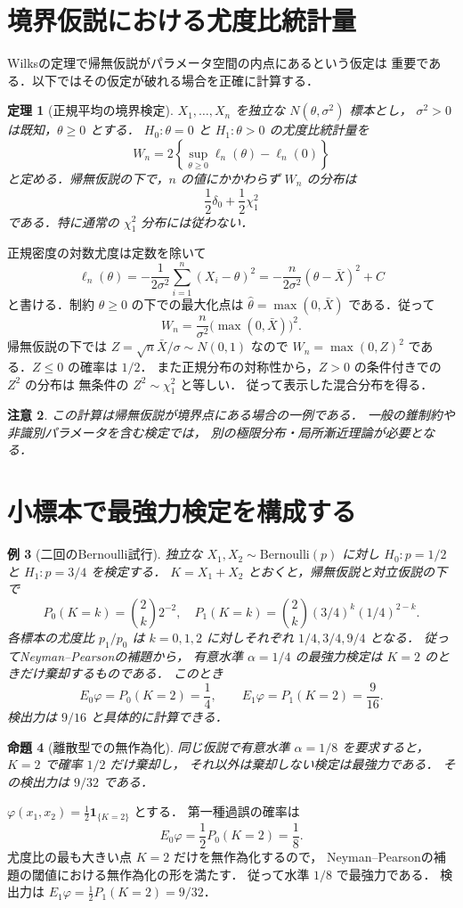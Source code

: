 \documentclass[a5paper,10pt,onecolumn]{jsarticle}
\makeatletter
\theoremstyle{mathnotetheorem}
\newtheorem{theorem}{定理}[section]
\newtheorem{proposition}[theorem]{命題}
\newtheorem{example}[theorem]{例}
\newtheorem{remark}[theorem]{注意}
\renewcommand{\proofname}{証明}
\renewenvironment{proof}[1][\proofname]{%
  \par\pushQED{\qed}\normalfont\topsep4\p@\@plus2\p@\relax
  \trivlist\item[\hskip\labelsep\bfseries #1]\ignorespaces
}{\popQED\endtrivlist\@endpefalse}
\makeatother
\begin{document}
\section{境界仮説における尤度比統計量}
Wilksの定理で帰無仮説がパラメータ空間の内点にあるという仮定は
重要である．以下ではその仮定が破れる場合を正確に計算する．
\begin{theorem}[正規平均の境界検定]
$X_1,\ldots,X_n$ を独立な $N(\theta,\sigma^2)$ 標本とし，
$\sigma^2>0$ は既知，$\theta\ge0$ とする．
$H_0:\theta=0$ と $H_1:\theta>0$ の尤度比統計量を
\[
 W_n=2\left\{\sup_{\theta\ge0}\ell_n(\theta)-\ell_n(0)\right\}
\]
と定める．帰無仮説の下で，$n$ の値にかかわらず
$W_n$ の分布は
\[
 \frac12\delta_0+\frac12\chi^2_1
\]
である．特に通常の $\chi^2_1$ 分布には従わない．
\end{theorem}
\begin{proof}
正規密度の対数尤度は定数を除いて
\[
 \ell_n(\theta)=-\frac1{2\sigma^2}
 \sum_{i=1}^n(X_i-\theta)^2
 =-\frac{n}{2\sigma^2}(\theta-\bar X)^2+C
\]
と書ける．制約 $\theta\ge0$ の下での最大化点は
$\widehat\theta=\max(0,\bar X)$ である．従って
\[
 W_n=\frac n{\sigma^2}\bigl(\max(0,\bar X)\bigr)^2.
\]
帰無仮説の下では $Z=\sqrt n\bar X/\sigma\sim N(0,1)$ なので
$W_n=\max(0,Z)^2$ である．$Z\le0$ の確率は $1/2$．
また正規分布の対称性から，$Z>0$ の条件付きでの $Z^2$ の分布は
無条件の $Z^2\sim\chi^2_1$ と等しい．
従って表示した混合分布を得る．
\end{proof}
\begin{remark}
この計算は帰無仮説が境界点にある場合の一例である．
一般の錐制約や非識別パラメータを含む検定では，
別の極限分布・局所漸近理論が必要となる．
\end{remark}


\section{小標本で最強力検定を構成する}
\begin{example}[二回のBernoulli試行]
独立な $X_1,X_2\sim\mathrm{Bernoulli}(p)$ に対し
$H_0:p=1/2$ と $H_1:p=3/4$ を検定する．
$K=X_1+X_2$ とおくと，帰無仮説と対立仮説の下で
\[
 P_0(K=k)=\binom2k2^{-2},\quad
 P_1(K=k)=\binom2k(3/4)^k(1/4)^{2-k}.
\]
各標本の尤度比 $p_1/p_0$ は
$k=0,1,2$ に対しそれぞれ
$1/4,3/4,9/4$ となる．
従ってNeyman--Pearsonの補題から，
有意水準 $\alpha=1/4$ の最強力検定は
$K=2$ のときだけ棄却するものである．
このとき
\[
 E_0\varphi=P_0(K=2)=\frac14,\qquad
 E_1\varphi=P_1(K=2)=\frac9{16}.
\]
検出力は $9/16$ と具体的に計算できる．
\end{example}
\begin{proposition}[離散型での無作為化]\label{prop:np-random}
同じ仮説で有意水準 $\alpha=1/8$ を要求すると，
$K=2$ で確率 $1/2$ だけ棄却し，
それ以外は棄却しない検定は最強力である．
その検出力は $9/32$ である．
\end{proposition}
\begin{proof}
$\varphi(x_1,x_2)=\frac12\mathbf1_{\{K=2\}}$ とする．
第一種過誤の確率は
\[
 E_0\varphi=\frac12P_0(K=2)=\frac18.
\]
尤度比の最も大きい点 $K=2$ だけを無作為化するので，
Neyman--Pearsonの補題の閾値における無作為化の形を満たす．
従って水準 $1/8$ で最強力である．
検出力は
$E_1\varphi=\frac12P_1(K=2)=9/32$．
\end{proof}
\end{document}
